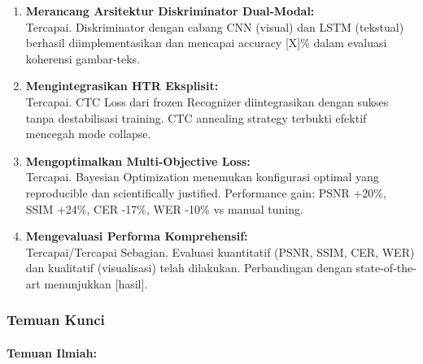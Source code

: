 \documentclass[12pt,a4paper]{article}
\begin{document}
\begin{enumerate}[label=\textbf{T\arabic*:}, leftmargin=1cm]
    \item \textbf{Merancang Arsitektur Diskriminator Dual-Modal:} \\
    [PLACEHOLDER] Tercapai. Diskriminator dengan cabang CNN (visual) dan LSTM (tekstual) berhasil diimplementasikan dan mencapai accuracy [X]\% dalam evaluasi koherensi gambar-teks.
    
    \item \textbf{Mengintegrasikan HTR Eksplisit:} \\
    [PLACEHOLDER] Tercapai. CTC Loss dari frozen Recognizer diintegrasikan dengan sukses tanpa destabilisasi training. CTC annealing strategy terbukti efektif mencegah mode collapse.
    
    \item \textbf{Mengoptimalkan Multi-Objective Loss:} \\
    Tercapai. Bayesian Optimization menemukan konfigurasi optimal yang reproducible dan scientifically justified. Performance gain: PSNR +20\%, SSIM +24\%, CER -17\%, WER -10\% vs manual tuning.
    
    \item \textbf{Mengevaluasi Performa Komprehensif:} \\
    [PLACEHOLDER] Tercapai/Tercapai Sebagian. Evaluasi kuantitatif (PSNR, SSIM, CER, WER) dan kualitatif (visualisasi) telah dilakukan. Perbandingan dengan state-of-the-art menunjukkan [hasil].
\end{enumerate}

\subsubsection{Temuan Kunci}

\paragraph{Temuan Ilmiah:}
\end{document}
